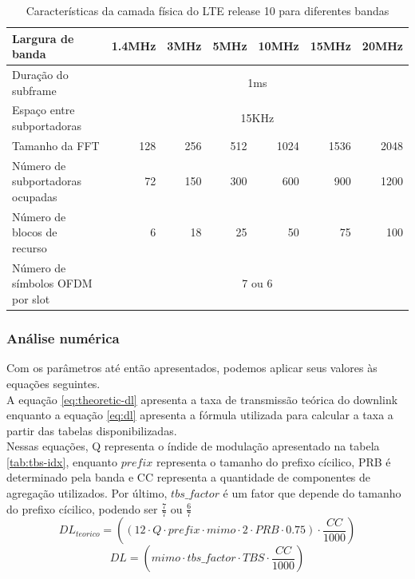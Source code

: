 \documentclass[journal,11pt,twocolumn]{IEEEtran}
\begin{document}
\begin{table}[h!]
    \centering
    \begin{tabular}{|l|r|r|r|r|r|r|}
        \hline
        Largura de banda & 1.4MHz & 3MHz & 5MHz & 10MHz & 15MHz & 20MHz \\
        \hline
        \makecell[l]{Duração do\\subframe} & \multicolumn{6}{c|}{1ms} \\
        \hline
        \makecell[l]{Espaço entre \\subportadoras} & \multicolumn{6}{c|}{15KHz} \\
        \hline
        Tamanho da FFT & 128 & 256 & 512 & 1024 & 1536 & 2048\\
        \hline
        \makecell[l]{Número de\\subportadoras\\ocupadas} & 72 & 150 & 300 & 600 & 900 & 1200\\
        \hline
        \makecell[l]{Número de\\blocos de\\recurso} & 6 & 18 & 25 & 50 & 75 & 100\\
        \hline
        \makecell[l]{Número de\\símbolos OFDM\\por slot} & \multicolumn{6}{c|}{7 ou 6} \\
        \hline
        \end{tabular}
    \caption{Características da camada física do LTE release 10 para diferentes bandas}
    \label{tab:prb}
\end{table}
\subsubsection{Análise numérica}
Com os parâmetros até então apresentados, podemos aplicar seus valores às equações seguintes. \\

A equação \ref{eq:theoretic-dl} apresenta a taxa de transmissão teórica do downlink enquanto a equação \ref{eq:dl} apresenta a fórmula utilizada para calcular a taxa a partir das tabelas disponibilizadas. \\

Nessas equações, Q representa o índide de modulação apresentado na tabela \ref{tab:tbs-idx}, enquanto $prefix$ representa o tamanho do prefixo cícilico, PRB é determinado pela banda e CC representa a quantidade de componentes de agregação utilizados. Por último, $tbs\_factor$ é um fator que depende do tamanho do prefixo cícilico, podendo ser $\frac{7}{7}$ ou $\frac{6}{7}$
\begin{equation}
   DL_{teorico} = ((12\cdot Q \cdot prefix \cdot mimo \cdot 2 \cdot PRB \cdot 0.75)\cdot\frac{CC}{1000})
   \label{eq:theoretic-dl}
\end{equation}
\begin{equation}
   DL = (mimo \cdot tbs\_factor\cdot TBS\cdot \frac{CC}{1000})
   \label{eq:dl}
   \end{equation}
\end{document}
